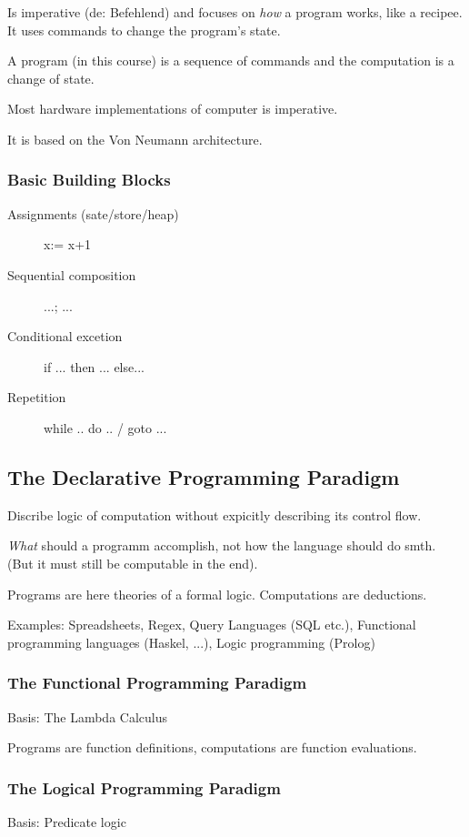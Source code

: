 Is imperative (de: Befehlend) and focuses on \emph{how} a program works, like a recipee. It uses commands to change the program's state.

A program (in this course) is a sequence of commands and the computation is a change of state.

Most hardware implementations of computer is imperative.

It is based on the Von Neumann architecture.

\subsubsection{Basic Building Blocks}

\begin{description}
	\item[Assignments (sate/store/heap)] x:= x+1 %
	\item[Sequential composition] ...; ...
	\item[Conditional excetion] if ... then ... else...
	\item[Repetition] while .. do .. / goto ...
\end{description}



\subsection{The Declarative Programming Paradigm}

Discribe logic of computation without expicitly describing its control flow.

\emph{What} should a programm accomplish, not how the language should do smth. (But it must still be computable in the end).

Programs are here theories of a formal logic. Computations are deductions.

Examples: Spreadsheets, Regex, Query Languages (SQL etc.), Functional programming languages (Haskel, ...), Logic programming (Prolog)

\subsubsection{The Functional Programming Paradigm}

Basis: The Lambda Calculus

Programs are function definitions, computations are function evaluations.

\subsubsection{The Logical Programming Paradigm}
Basis: Predicate logic


